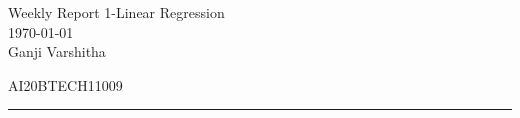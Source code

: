 \documentclass[12pt,letterpaper, onecolumn]{exam}
\begin{document}
\newtheorem{theorem}{Theorem}[section]
\newtheorem{problem}{Problem}
\newtheorem{proposition}{Proposition}[section]
\newtheorem{lemma}{Lemma}[section]
\newtheorem{corollary}[theorem]{Corollary}
\newtheorem{example}{Example}[section]
\newtheorem{definition}[problem]{Definition}

\newcommand{\BEQA}{\begin{eqnarray}}
\newcommand{\EEQA}{\end{eqnarray}}
\newcommand{\define}{\stackrel{\triangle}{=}}

\raggedbottom
\setlength{\parindent}{0pt}
\providecommand{\mbf}{\mathbf}
\providecommand{\norm}[1]{\lVert#1\rVert}
\providecommand{\pr}[1]{\ensuremath{\Pr\left(#1\right)}}
\providecommand{\qfunc}[1]{\ensuremath{Q\left(#1\right)}}
\providecommand{\sbrak}[1]{\ensuremath{{}\left[#1\right]}}
\providecommand{\lsbrak}[1]{\ensuremath{{}\left[#1\right.}}
\providecommand{\rsbrak}[1]{\ensuremath{{}\left.#1\right]}}
\providecommand{\brak}[1]{\ensuremath{\left(#1\right)}}
\providecommand{\lbrak}[1]{\ensuremath{\left(#1\right.}}
\providecommand{\rbrak}[1]{\ensuremath{\left.#1\right)}}
\providecommand{\cbrak}[1]{\ensuremath{\left\{#1\right\}}}
\providecommand{\lcbrak}[1]{\ensuremath{\left\{#1\right.}}
\providecommand{\rcbrak}[1]{\ensuremath{\left.#1\right\}}}
\let\vec\mathbf




\begingroup  
    \centering
    
    \LARGE Weekly Report 1-Linear Regression\\[0.5em]
    \large \today\\[0.5em]
    \large Ganji Varshitha\par
    \large AI20BTECH11009\par
\endgroup
\rule{\textwidth}{0.4pt}
\pointsdroppedatright   %
\printanswers
\newcommand\Solution{
  \textbf{Solution:}\\}
\newcommand{\myvec}[1]{\ensuremath{\begin{bmatrix}#1\end{bmatrix}}}
\end{document}
